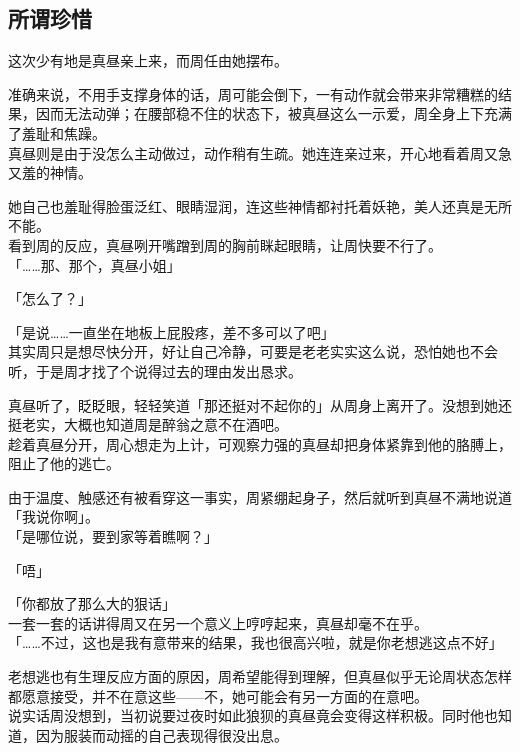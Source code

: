 \subsection{所谓珍惜}

这次少有地是真昼亲上来，而周任由她摆布。

准确来说，不用手支撑身体的话，周可能会倒下，一有动作就会带来非常糟糕的结果，因而无法动弹；在腰部稳不住的状态下，被真昼这么一示爱，周全身上下充满了羞耻和焦躁。\\

真昼则是由于没怎么主动做过，动作稍有生疏。她连连亲过来，开心地看着周又急又羞的神情。

她自己也羞耻得脸蛋泛红、眼睛湿润，连这些神情都衬托着妖艳，美人还真是无所不能。\\

看到周的反应，真昼咧开嘴蹭到周的胸前眯起眼睛，让周快要不行了。\\

「……那、那个，真昼小姐」

「怎么了？」

「是说……一直坐在地板上屁股疼，差不多可以了吧」\\

其实周只是想尽快分开，好让自己冷静，可要是老老实实这么说，恐怕她也不会听，于是周才找了个说得过去的理由发出恳求。

真昼听了，眨眨眼，轻轻笑道「那还挺对不起你的」从周身上离开了。没想到她还挺老实，大概也知道周是醉翁之意不在酒吧。\\

趁着真昼分开，周心想走为上计，可观察力强的真昼却把身体紧靠到他的胳膊上，阻止了他的逃亡。

由于温度、触感还有被看穿这一事实，周紧绷起身子，然后就听到真昼不满地说道「我说你啊」。\\

「是哪位说，要到家等着瞧啊？」

「唔」

「你都放了那么大的狠话」\\

一套一套的话讲得周又在另一个意义上哼哼起来，真昼却毫不在乎。\\

「……不过，这也是我有意带来的结果，我也很高兴啦，就是你老想逃这点不好」

老想逃也有生理反应方面的原因，周希望能得到理解，但真昼似乎无论周状态怎样都愿意接受，并不在意这些——不，她可能会有另一方面的在意吧。\\

说实话周没想到，当初说要过夜时如此狼狈的真昼竟会变得这样积极。同时他也知道，因为服装而动摇的自己表现得很没出息。\\

